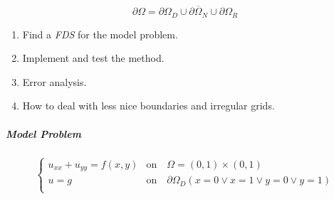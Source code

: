 \[
  \partial \Omega = \overline{\partial \Omega_D \cup \partial \Omega_N \cup \partial \Omega_R}
\]

\begin{enumerate}
  \item Find a \emph{FDS} for the model problem.
  \item Implement and test the method.
  \item Error analysis.
  \item How to deal with less nice boundaries and irregular grids.
\end{enumerate}

\subparagraph{Model Problem}
\[
  \begin{cases}
    u_{xx} + u_{yy} = f(x,y) & \text{on} \quad \Omega = (0,1) \times (0,1)                                \\
    u = g                    & \text{on} \quad \partial \Omega_D (x = 0 \lor x = 1 \lor y = 0 \lor y = 1) \\
  \end{cases}
\]

